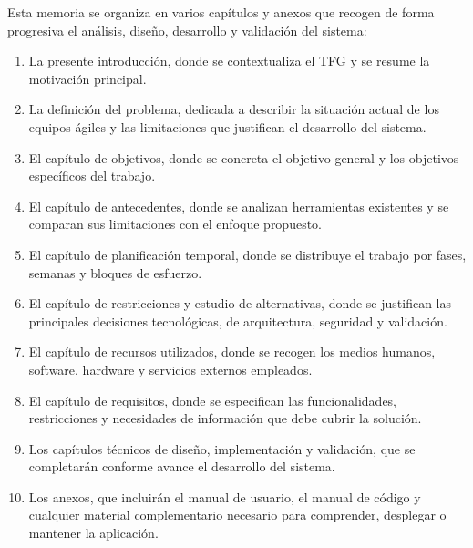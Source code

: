Esta memoria se organiza en varios capítulos y anexos que recogen de forma progresiva el análisis, diseño, desarrollo y validación del sistema:
\begin{enumerate}
\item La presente introducción, donde se contextualiza el TFG y se resume la motivación principal.
\item La definición del problema, dedicada a describir la situación actual de los equipos ágiles y las limitaciones que justifican el desarrollo del sistema.
\item El capítulo de objetivos, donde se concreta el objetivo general y los objetivos específicos del trabajo.
\item El capítulo de antecedentes, donde se analizan herramientas existentes y se comparan sus limitaciones con el enfoque propuesto.
\item El capítulo de planificación temporal, donde se distribuye el trabajo por fases, semanas y bloques de esfuerzo.
\item El capítulo de restricciones y estudio de alternativas, donde se justifican las principales decisiones tecnológicas, de arquitectura, seguridad y validación.
\item El capítulo de recursos utilizados, donde se recogen los medios humanos, software, hardware y servicios externos empleados.
\item El capítulo de requisitos, donde se especifican las funcionalidades, restricciones y necesidades de información que debe cubrir la solución.
\item Los capítulos técnicos de diseño, implementación y validación, que se completarán conforme avance el desarrollo del sistema.
\item Los anexos, que incluirán el manual de usuario, el manual de código y cualquier material complementario necesario para comprender, desplegar o mantener la aplicación.
\end{enumerate}
